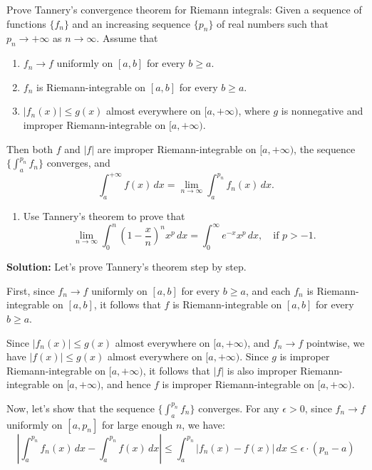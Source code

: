 \begin{problembox}
Prove Tannery's convergence theorem for Riemann integrals: Given a sequence of functions $\{f_n\}$ and an increasing sequence $\{p_n\}$ of real numbers such that $p_n \to +\infty$ as $n \to \infty$. Assume that
\begin{enumerate}[label=(\alph*)]
    \item $f_n \to f$ uniformly on $[a,b]$ for every $b \geq a$.
    \item $f_n$ is Riemann-integrable on $[a,b]$ for every $b \geq a$.
    \item $|f_n(x)| \leq g(x)$ almost everywhere on $[a,+\infty)$, where $g$ is nonnegative and improper Riemann-integrable on $[a,+\infty)$.
\end{enumerate}
Then both $f$ and $|f|$ are improper Riemann-integrable on $[a,+\infty)$, the sequence $\{\int_a^{p_n} f_n\}$ converges, and
\[\int_{a}^{+\infty} f(x) \, dx = \lim_{n \to \infty} \int_{a}^{p_n} f_n(x) \, dx.\]

\begin{enumerate}[label=(\alph*),resume]
    \item Use Tannery's theorem to prove that
    \[\lim_{n \to \infty} \int_{0}^{n} \left( 1 - \frac{x}{n} \right)^n x^p \, dx = \int_{0}^{\infty} e^{-x}x^p \, dx, \quad \text{if } p > -1.\]
\end{enumerate}
\end{problembox}

\noindent\textbf{Solution:}
Let's prove Tannery's theorem step by step.

First, since $f_n \to f$ uniformly on $[a,b]$ for every $b \geq a$, and each $f_n$ is Riemann-integrable on $[a,b]$, it follows that $f$ is Riemann-integrable on $[a,b]$ for every $b \geq a$.

Since $|f_n(x)| \leq g(x)$ almost everywhere on $[a,+\infty)$, and $f_n \to f$ pointwise, we have $|f(x)| \leq g(x)$ almost everywhere on $[a,+\infty)$. Since $g$ is improper Riemann-integrable on $[a,+\infty)$, it follows that $|f|$ is also improper Riemann-integrable on $[a,+\infty)$, and hence $f$ is improper Riemann-integrable on $[a,+\infty)$.

Now, let's show that the sequence $\{\int_a^{p_n} f_n\}$ converges. For any $\epsilon > 0$, since $f_n \to f$ uniformly on $[a, p_n]$ for large enough $n$, we have:
\[|\int_a^{p_n} f_n(x) \, dx - \int_a^{p_n} f(x) \, dx| \leq \int_a^{p_n} |f_n(x) - f(x)| \, dx \leq \epsilon \cdot (p_n - a)\]

